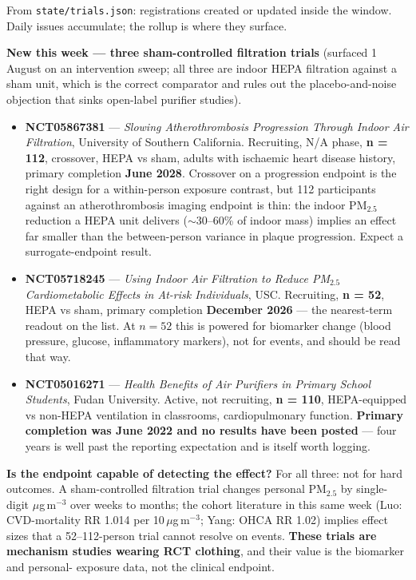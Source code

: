 \documentclass[10pt]{article}
\begin{document}
{\fontsize{7.4}{9}\selectfont\color{Slate}From \texttt{state/trials.json}: registrations
created or updated inside the window. Daily issues accumulate; the rollup is where they
surface.\par}

\vspace{1.5mm}
\footnotesize
\textbf{New this week --- three sham-controlled filtration trials} (surfaced 1 August on
an intervention sweep; all three are indoor HEPA filtration against a sham unit, which is
the correct comparator and rules out the placebo-and-noise objection that sinks
open-label purifier studies).

\begin{itemize}\setlength{\itemsep}{1.0mm}
\item \textbf{NCT05867381} --- \textit{Slowing Atherothrombosis Progression Through Indoor
Air Filtration}, University of Southern California. Recruiting, N/A phase, \textbf{n =
112}, crossover, HEPA vs sham, adults with ischaemic heart disease history, primary
completion \textbf{June 2028}. Crossover on a progression endpoint is the right design
for a within-person exposure contrast, but 112 participants against an atherothrombosis
imaging endpoint is thin: the indoor PM$_{2.5}$ reduction a HEPA unit delivers
($\sim$30--60\% of indoor mass) implies an effect far smaller than the between-person
variance in plaque progression. Expect a surrogate-endpoint result.

\item \textbf{NCT05718245} --- \textit{Using Indoor Air Filtration to Reduce PM$_{2.5}$
Cardiometabolic Effects in At-risk Individuals}, USC. Recruiting, \textbf{n = 52},
HEPA vs sham, primary completion \textbf{December 2026} --- the nearest-term readout on
the list. At $n = 52$ this is powered for biomarker change (blood pressure, glucose,
inflammatory markers), not for events, and should be read that way.

\item \textbf{NCT05016271} --- \textit{Health Benefits of Air Purifiers in Primary School
Students}, Fudan University. Active, not recruiting, \textbf{n = 110}, HEPA-equipped vs
non-HEPA ventilation in classrooms, cardiopulmonary function. \textbf{Primary completion
was June 2022 and no results have been posted} --- four years is well past the reporting
expectation and is itself worth logging.
\end{itemize}

\vspace{1.5mm}
\textbf{Is the endpoint capable of detecting the effect?} For all three: not for hard
outcomes. A sham-controlled filtration trial changes personal PM$_{2.5}$ by single-digit
$\mu$g\,m$^{-3}$ over weeks to months; the cohort literature in this same week
(Luo: CVD-mortality RR 1.014 per 10\,$\mu$g\,m$^{-3}$; Yang: OHCA RR 1.02) implies effect
sizes that a 52--112-person trial cannot resolve on events. \textbf{These trials are
mechanism studies wearing RCT clothing}, and their value is the biomarker and personal-
exposure data, not the clinical endpoint.
\end{document}
